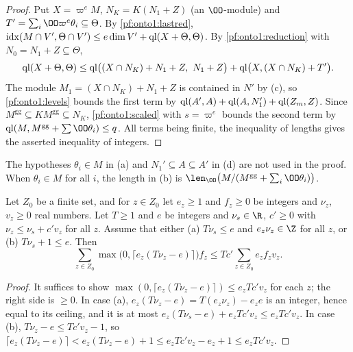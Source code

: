 \begin{proof}
Put $X=\varpi^eM$, $N_K=K(N_1+Z)$ (an $\OO$-module) and $T'=\sum_i\OO\varpi^e\theta_i\subseteq\Theta$. By
\cref{pf:onto1:lastred}, $\operatorname{idx}(M\cap V',\Theta\cap V')\le e\dim V'+\operatorname{ql}(X+\Theta,\Theta)$. By
\cref{pf:onto1:reduction} with $N_0=N_1+Z\subseteq\Theta$,
\[
\operatorname{ql}(X+\Theta,\Theta)\le\operatorname{ql}\bigl((X\cap N_K)+N_1+Z,\ N_1+Z\bigr)+\operatorname{ql}\bigl(X,(X\cap N_K)+T'\bigr).
\]
The module $M_1=(X\cap N_K)+N_1+Z$ is contained in $N'$ by (c), so \cref{pf:onto1:levels} bounds the first term by
$\operatorname{ql}(A',A)+\operatorname{ql}(A,N_1')+\operatorname{ql}(Z_m,Z)$. Since $M^{\mathrm{gg}}\subseteq KM^{\mathrm{gg}}\subseteq N_K$,
\cref{pf:onto1:scaled} with $s=\varpi^e$ bounds the second term by $\ontooneql(M,M^{\mathrm{gg}}+\sum\OO\theta_i)\le q$.
All terms being finite, the inequality of lengths gives the asserted inequality of integers.
\end{proof}

\begin{remark}\label{pf:onto1:rem-localstep}
The hypotheses $\theta_i\in M$ in (a) and $N_1'\subseteq A\subseteq A'$ in (d) are not used in the proof. When
$\theta_i\in M$ for all $i$, the length in (b) is $\len_{\OO}\bigl(M/(M^{\mathrm{gg}}+\sum_i\OO\theta_i)\bigr)$.
\end{remark}

\begin{lemma}\label{pf:onto1:levelsChain}
Let $Z_0$ be a finite set, and for $z\in Z_0$ let $e_z\ge1$ and $f_z\ge0$ be integers and $\nu_z$, $v_z\ge0$ real
numbers. Let $T\ge1$ and $e$ be integers and $\nu_s\in\R$, $c'\ge0$ with $\nu_z\le\nu_s+c'v_z$ for all $z$.
Assume that either (a) $T\nu_s\le e$ and $e_z\nu_z\in\Z$ for all $z$, or (b) $T\nu_s+1\le e$. Then
\[
\sum_{z\in Z_0}\max\bigl(0,\lceil e_z(T\nu_z-e)\rceil\bigr)f_z\le Tc'\sum_{z\in Z_0}e_zf_zv_z.
\]
\end{lemma}

\begin{proof}
It suffices to show $\max(0,\lceil e_z(T\nu_z-e)\rceil)\le e_zTc'v_z$ for each $z$; the right side is $\ge0$. In
case (a), $e_z(T\nu_z-e)=T(e_z\nu_z)-e_ze$ is an integer, hence equal to its ceiling, and it is at most
$e_z(T\nu_s-e)+e_zTc'v_z\le e_zTc'v_z$. In case (b), $T\nu_z-e\le Tc'v_z-1$, so
$\lceil e_z(T\nu_z-e)\rceil<e_z(T\nu_z-e)+1\le e_zTc'v_z-e_z+1\le e_zTc'v_z$.
\end{proof}

